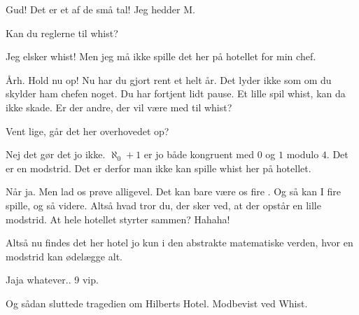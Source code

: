 \documentclass[a4paper,11pt]{article}
\begin{document}
\begin{sketch}
 Gud! Det er et af de små tal! Jeg hedder M.

 Kan du reglerne til whist?


 Jeg elsker whist! Men jeg må ikke spille det her på hotellet for min chef.

 Årh. Hold nu op! Nu har du gjort rent et helt år. Det lyder ikke som om du skylder ham chefen noget. Du har fortjent lidt pause. Et lille spil whist, kan da ikke skade.  Er der andre, der vil være med til whist?


 Vent lige, går det her overhovedet op?

 Nej det gør det jo ikke. $\aleph_0+1$ er jo både kongruent med $0$ og $1$ modulo $4$. Det er en modstrid. Det er derfor man ikke kan spille whist her på hotellet.

 Når ja. Men lad os prøve alligevel. Det kan bare være os fire . Og så kan I fire spille, og så videre. Altså hvad tror du, der sker ved, at der opstår en lille modstrid. At hele hotellet styrter sammen? Hahaha!

 Altså nu findes det her hotel jo kun i den abstrakte matematiske verden, hvor en modstrid kan ødelægge alt.

 Jaja whatever..  9 vip.



 Og sådan sluttede tragedien om Hilberts Hotel. Modbevist ved Whist.






\end{sketch}
\end{document}
